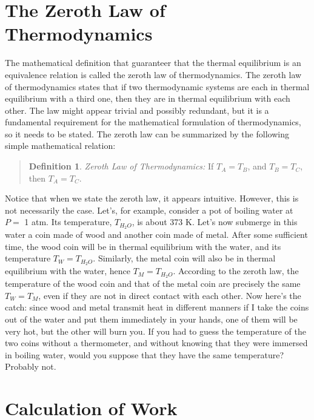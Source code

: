 \documentclass[
]{book}
\theoremstyle{definition}
\newtheorem{definition}{Definition}[chapter]
\theoremstyle{definition}
\theoremstyle{definition}
\theoremstyle{remark}
\begin{document}
\hypertarget{the-zeroth-law-of-thermodynamics}{%
\section{The Zeroth Law of Thermodynamics}\label{the-zeroth-law-of-thermodynamics}}

The mathematical definition that guaranteer that the thermal equilibrium is an equivalence relation is called the zeroth law of thermodynamics. The zeroth law of thermodynamics states that if two thermodynamic systems are each in thermal equilibrium with a third one, then they are in thermal equilibrium with each other. The law might appear trivial and possibly redundant, but it is a fundamental requirement for the mathematical formulation of thermodynamics, so it needs to be stated. The zeroth law can be summarized by the following simple mathematical relation:

\begin{quote}
\begin{definition}
\protect\hypertarget{def:zerothlaw}{}{\label{def:zerothlaw} }\emph{Zeroth Law of Thermodynamics:} If \(T_A = T_B\), and \(T_B = T_C\), then \(T_A = T_C\).
\end{definition}
\end{quote}

Notice that when we state the zeroth law, it appears intuitive. However, this is not necessarily the case. Let's, for example, consider a pot of boiling water at \(P=\) 1 atm. Its temperature, \(T_{H_2O}\), is about 373 K. Let's now submerge in this water a coin made of wood and another coin made of metal. After some sufficient time, the wood coin will be in thermal equilibrium with the water, and its temperature \(T_W = T_{H_2O}\). Similarly, the metal coin will also be in thermal equilibrium with the water, hence \(T_M = T_{H_2O}\). According to the zeroth law, the temperature of the wood coin and that of the metal coin are precisely the same \(T_W = T_M\), even if they are not in direct contact with each other. Now here's the catch: since wood and metal transmit heat in different manners if I take the coins out of the water and put them immediately in your hands, one of them will be very hot, but the other will burn you. If you had to guess the temperature of the two coins without a thermometer, and without knowing that they were immersed in boiling water, would you suppose that they have the same temperature? Probably not.

\hypertarget{workint}{%
\section{Calculation of Work}\label{workint}}
\end{document}
